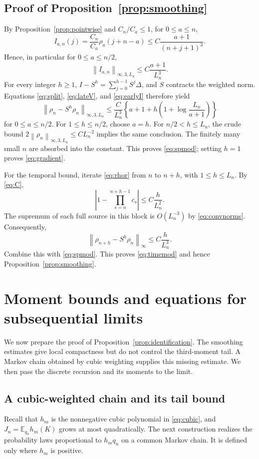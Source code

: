 \documentclass[11pt,letterpaper,reqno]{amsart}
\theoremstyle{plain}
\newcommand{\E}{\mathbb E}\newcommand{\Pp}{\mathbb P}
\newcommand{\norm}[1]{\left\lVert#1\right\rVert}
\begin{document}
\subsection{Proof of Proposition~\ref{prop:smoothing}}
By Proposition~\ref{prop:pointwise} and $C_n/C_a\le1$, for $0\le a\le n$,
\[
 I_{a,n}(j)=\frac{C_n}{C_a}\rho_a(j+n-a)
 \le C\frac{a+1}{(n+j+1)^3}.
\]
Hence, in particular for $0\le a\le n/2$,
\begin{equation}\label{eq:earlyI}
 \norm{I_{a,n}}_{\infty,3,L_n}\le C\frac{a+1}{L_n^3}.
\end{equation}
For every integer $h\ge1$, $I-S^h=\sum_{j=0}^{h-1}S^j\Delta$, and $S$ contracts the weighted norm. Equations \eqref{eq:split}, \eqref{eq:lateV}, and \eqref{eq:earlyI} therefore yield
\begin{equation}\label{eq:twoparameter}
 \norm{\rho_n-S^h\rho_n}_{\infty,3,L_n}
 \le \frac C{L_n^3}\left\{a+1+h\left(1+\log\frac{L_n}{a+1}\right)\right\}
\end{equation}
for $0\le a\le n/2$. For $1\le h\le n/2$, choose $a=h$. For $n/2<h\le L_n$, the crude bound $2\norm{\rho_n}_{\infty,3,L_n}\le CL_n^{-2}$ implies the same conclusion. The finitely many small $n$ are absorbed into the constant. This proves \eqref{eq:spmod}; setting $h=1$ proves \eqref{eq:gradient}.

For the temporal bound, iterate \eqref{eq:rhor} from $n$ to $n+h$, with $1\le h\le L_n$. By \eqref{eq:C},
\[
 \left|1-\prod_{s=n}^{n+h-1}c_s\right|\le C\frac h{L_n^2}.
\]
The supremum of each full source in this block is $O(L_n^{-3})$ by \eqref{eq:convnorms}. Consequently,
\[
 \norm{\rho_{n+h}-S^h\rho_n}_\infty\le C\frac h{L_n^3}.
\]
Combine this with \eqref{eq:spmod}. This proves \eqref{eq:timemod} and hence Proposition~\ref{prop:smoothing}.

\section{Moment bounds and equations for subsequential limits}\label{sec:limits}
We now prepare the proof of Proposition~\ref{prop:identification}. The smoothing estimates give local compactness but do not control the third-moment tail. A Markov chain obtained by cubic weighting supplies this missing estimate. We then pass the discrete recursion and its moments to the limit.

\subsection{A cubic-weighted chain and its tail bound}
Recall that $h_m$ is the nonnegative cubic polynomial in \eqref{eq:cubic}, and $J_n=\E_{q_n}h_m(K)$ grows at most quadratically. The next construction realizes the probability laws proportional to $h_mq_n$ on a common Markov chain. It is defined only where $h_m$ is positive.
\end{document}
